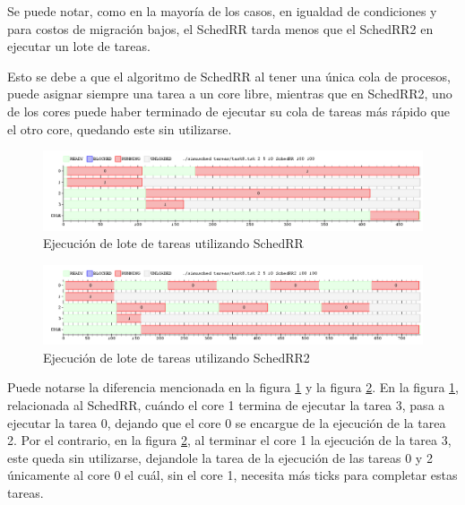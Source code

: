 \documentclass[a4paper,10pt,twoside]{article}
\begin{document}
Se puede notar, como en la mayoría de los casos, en igualdad de condiciones y para costos de migración bajos, el SchedRR tarda menos que el SchedRR2 en ejecutar un lote de tareas.

Esto se debe a que el algoritmo de SchedRR al tener una única cola de procesos, puede asignar siempre una tarea a un core libre, mientras que en SchedRR2, uno de los cores puede haber terminado de ejecutar su cola de tareas más rápido que el otro core, quedando este sin utilizarse.

\begin{figure}[ht!]
\centering
\includegraphics[width=175mm]{../ejercicio8/schedRRej8.png}
\caption{Ejecución de lote de tareas utilizando SchedRR}
\label{schedRRej8}
\end{figure}

\begin{figure}[ht!]
\centering
\includegraphics[width=175mm]{../ejercicio8/schedRR2ej8.png}
\caption{Ejecución de lote de tareas utilizando SchedRR2}
\label{schedRR2ej8}
\end{figure}

Puede notarse la diferencia mencionada en la figura \ref{schedRRej8} y la figura \ref{schedRR2ej8}. En la figura \ref{schedRRej8}, relacionada al SchedRR, cuándo el core 1 termina de ejecutar la tarea 3, pasa a ejecutar la tarea 0, dejando que el core 0 se encargue de la ejecución de la tarea 2. Por el contrario, en la figura \ref{schedRR2ej8}, al terminar el core 1 la ejecución de la tarea 3, este queda sin utilizarse, dejandole la tarea de la ejecución de las tareas 0 y 2 únicamente al core 0 el cuál, sin el core 1, necesita más ticks para completar estas tareas.

\end{document}
